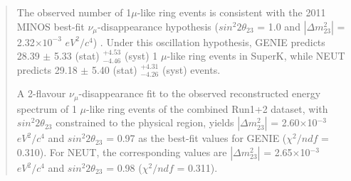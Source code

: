 \begin{frontmatter}
\begin{abstract}
The observed number of 1$\mu$-like ring events is consistent with 
the 2011 MINOS best-fit $\nu_{\mu}$-disappearance hypothesis
($sin^{2}2\theta_{23}$ = 1.0 and $|\Delta m^{2}_{23}|$ = 2.32$\times10^{-3}$ $eV^{2}/c^{4}$) \cite{Minos2011}.
Under this oscillation hypothesis,
GENIE predicts 28.39 $\pm$ 5.33 (stat) $^{+4.53}_{-4.46}$ (syst) 1 $\mu$-like ring events
in SuperK, while NEUT predicts 29.18 $\pm$ 5.40 (stat) $^{+4.31}_{-4.26}$ (syst) events. 

A 2-flavour $\nu_{\mu}$-disappearance fit to
the observed reconstructed energy spectrum of 1 $\mu$-like ring events of the combined Run1+2 dataset,
with $sin^{2}2\theta_{23}$ constrained to the physical region,
yields
$|\Delta m^{2}_{23}|$ = 2.60$\times$10$^{-3}$ $eV^{2}/c^{4}$ and
$sin^{2}2\theta_{23}$ = 0.97
as the best-fit values for GENIE ($\chi^{2}/ndf$ = 0.310).
For NEUT, the corresponding values are
$|\Delta m^{2}_{23}|$ = 2.65$\times$10$^{-3}$ $eV^{2}/c^{4}$ and
$sin^{2}2\theta_{23}$ = 0.98 ($\chi^{2}/ndf$ = 0.311).

\end{abstract}

%
%


\end{frontmatter}

\clearpage

\tableofcontents

\clearpage

\listoffigures
\listoftables


